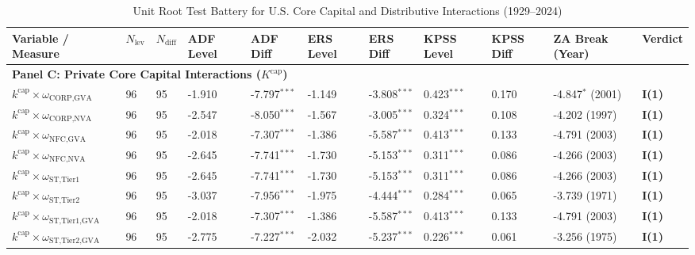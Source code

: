 \begin{landscape}
\begin{table}[h!]
\centering
\footnotesize
\setlength{\tabcolsep}{3pt}
\caption{Unit Root Test Battery for U.S. Core Capital and Distributive Interactions (1929--2024)}
\label{tab:urca_results_kcap}
\begin{tabular}{p{5.8cm} p{0.6cm} p{0.6cm} p{1.4cm} p{1.4cm} p{1.4cm} p{1.4cm} p{1.4cm} p{1.4cm} p{2.2cm} p{2.2cm}}
\toprule
\textbf{Variable / Measure} & \textbf{$N_{\text{lev}}$} & \textbf{$N_{\text{diff}}$} & \textbf{ADF Level} & \textbf{ADF Diff} & \textbf{ERS Level} & \textbf{ERS Diff} & \textbf{KPSS Level} & \textbf{KPSS Diff} & \textbf{ZA Break (Year)} & \textbf{Verdict} \\
\midrule
\multicolumn{11}{l}{\textbf{Panel C: Private Core Capital Interactions ($K^{\text{cap}}$)}} \\
\midrule
$k^{\text{cap}} \times \omega_{\text{CORP,GVA}}$ & 96 & 95 & -1.910 & -7.797$^{***}$ & -1.149 & -3.808$^{***}$ & 0.423$^{***}$ & 0.170 & -4.847$^{*}$ (2001) & \textbf{I(1)} \\
$k^{\text{cap}} \times \omega_{\text{CORP,NVA}}$ & 96 & 95 & -2.547 & -8.050$^{***}$ & -1.567 & -3.005$^{***}$ & 0.324$^{***}$ & 0.108 & -4.202 (1997) & \textbf{I(1)} \\
$k^{\text{cap}} \times \omega_{\text{NFC,GVA}}$ & 96 & 95 & -2.018 & -7.307$^{***}$ & -1.386 & -5.587$^{***}$ & 0.413$^{***}$ & 0.133 & -4.791 (2003) & \textbf{I(1)} \\
$k^{\text{cap}} \times \omega_{\text{NFC,NVA}}$ & 96 & 95 & -2.645 & -7.741$^{***}$ & -1.730 & -5.153$^{***}$ & 0.311$^{***}$ & 0.086 & -4.266 (2003) & \textbf{I(1)} \\
$k^{\text{cap}} \times \omega_{\text{ST,Tier1}}$ & 96 & 95 & -2.645 & -7.741$^{***}$ & -1.730 & -5.153$^{***}$ & 0.311$^{***}$ & 0.086 & -4.266 (2003) & \textbf{I(1)} \\
$k^{\text{cap}} \times \omega_{\text{ST,Tier2}}$ & 96 & 95 & -3.037 & -7.956$^{***}$ & -1.975 & -4.444$^{***}$ & 0.284$^{***}$ & 0.065 & -3.739 (1971) & \textbf{I(1)} \\
$k^{\text{cap}} \times \omega_{\text{ST,Tier1,GVA}}$ & 96 & 95 & -2.018 & -7.307$^{***}$ & -1.386 & -5.587$^{***}$ & 0.413$^{***}$ & 0.133 & -4.791 (2003) & \textbf{I(1)} \\
$k^{\text{cap}} \times \omega_{\text{ST,Tier2,GVA}}$ & 96 & 95 & -2.775 & -7.227$^{***}$ & -2.032 & -5.237$^{***}$ & 0.226$^{***}$ & 0.061 & -3.256 (1975) & \textbf{I(1)} \\

\end{tabular}
\end{table}
\end{landscape}
